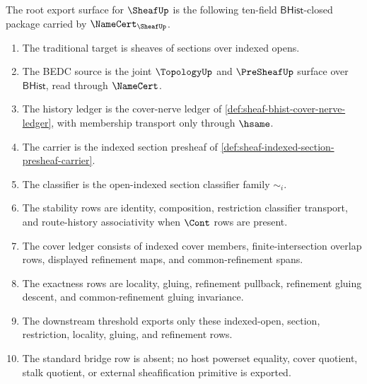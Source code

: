 \begin{definition}
\label{def:sheaf-root-export-bhist-closure-surface}
The root export surface for $\SheafUp$ is the following ten-field $\mathsf{BHist}$-closed package carried by $\NameCert_{\SheafUp}$.
\begin{enumerate}
\item The traditional target is sheaves of sections over indexed opens.
\item The BEDC source is the joint $\TopologyUp$ and $\PreSheafUp$ surface over $\mathsf{BHist}$, read through $\NameCert$.
\item The history ledger is the cover-nerve ledger of \autoref{def:sheaf-bhist-cover-nerve-ledger}, with membership transport only through $\hsame$.
\item The carrier is the indexed section presheaf of \autoref{def:sheaf-indexed-section-presheaf-carrier}.
\item The classifier is the open-indexed section classifier family $\sim_i$.
\item The stability rows are identity, composition, restriction classifier transport, and route-history associativity when $\Cont$ rows are present.
\item The cover ledger consists of indexed cover members, finite-intersection overlap rows, displayed refinement maps, and common-refinement spans.
\item The exactness rows are locality, gluing, refinement pullback, refinement gluing descent, and common-refinement gluing invariance.
\item The downstream threshold exports only these indexed-open, section, restriction, locality, gluing, and refinement rows.
\item The standard bridge row is absent; no host powerset equality, cover quotient, stalk quotient, or external sheafification primitive is exported.
\end{enumerate}
\end{definition}

